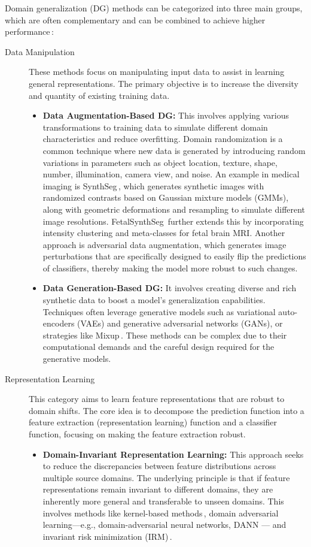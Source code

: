 Domain generalization (DG) methods can be categorized into three main groups, which are often complementary and can be combined to achieve higher performance\,\cite{Wang2023}:
\begin{description}
    \item[Data Manipulation] These methods focus on manipulating input data to assist in learning general representations. The primary objective is to increase the diversity and quantity of existing training data.
    \begin{itemize}
        \item \textbf{Data Augmentation-Based DG:} This involves applying various transformations to training data  to simulate different domain characteristics and reduce overfitting. Domain randomization is a common technique where new data is generated by introducing random variations in parameters such as object location, texture, shape, number, illumination, camera view, and noise. An example in medical imaging is SynthSeg\,\cite{Billot2023}, which generates synthetic images with randomized contrasts based on Gaussian mixture models (GMMs), along with geometric deformations and resampling to simulate different image resolutions. FetalSynthSeg\,\cite{Billot2023} further extends this by incorporating intensity clustering and meta-classes for fetal brain MRI. Another approach is adversarial data augmentation, which generates image perturbations that are specifically designed to easily flip the predictions of classifiers, thereby making the model more robust to such changes.
        \item \textbf{Data Generation-Based DG:} It involves creating diverse and rich synthetic data to boost a model's generalization capabilities. Techniques often leverage generative models such as variational auto-encoders (VAEs) and generative adversarial networks (GANs), or strategies like Mixup\,\cite{Zhang2018}. These methods can be complex due to their computational demands and the careful design required for the generative models.
    \end{itemize}
    \item[Representation Learning] This category aims to learn feature representations that are robust to domain shifts. The core idea is to decompose the prediction function into a feature extraction (representation learning) function and a classifier function, focusing on making the feature extraction robust.
    \begin{itemize}
        \item \textbf{Domain-Invariant Representation Learning:} This approach seeks to reduce the discrepancies between feature distributions across multiple source domains. The underlying principle is that if feature representations remain invariant to different domains, they are inherently more general and transferable to unseen domains. This involves methods like kernel-based methods\,\cite{Blanchard2021}, domain adversarial learning---e.g., domain-adversarial neural networks, DANN \cite{Ganin2015, Ganin2016}--- and invariant risk minimization (IRM)\,\cite{Krueger2021}.

\end{itemize}
\end{description}
